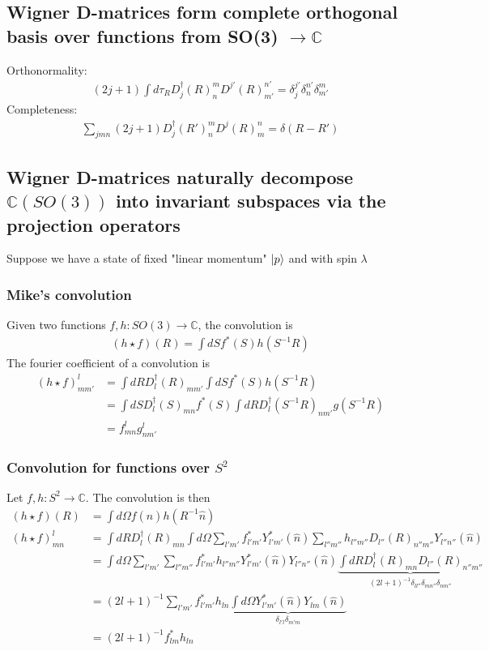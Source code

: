 \documentclass{article}
\begin{document}
\subsection{Wigner D-matrices form complete orthogonal basis over functions from SO(3) $\rightarrow \mathbb{C}$}

Orthonormality:
\begin{align}
    (2j+1)\int d\tau_R D^{\dagger}_j(R)^m_n D^{j'}(R)^{n'}_{m'} = \delta^{j'}_j\delta^{n'}_n\delta^{m}_{m'}
\end{align}
Completeness:
\begin{align}
    \sum_{jmn}(2j+1)D^{\dagger}_j(R')^m_n D^{j}(R)^{n}_{m} = \delta(R - R')
\end{align}

\subsection{Wigner D-matrices naturally decompose $\mathbb{C}(SO(3))$ into invariant subspaces via the projection operators}

Suppose we have a state of fixed "linear momentum" $\ket{p}$ and with spin $\lambda$


\subsubsection{Mike's convolution}
Given two functions $f,h:SO(3)\rightarrow \mathbb{C}$, the convolution is 
\begin{align}
    (h\star f)(R) = \int dS f^{*}(S)h(S^{-1}R)
\end{align}
The fourier coefficient of a convolution is
\begin{align}
    (h \star f)^{l}_{mm'} &= \int dR D^{\dagger}_l(R)_{mm'} \int dS f^{*}(S)h(S^{-1}R)\\
    &= \int dS D^{\dagger}_l(S)_{mn} f^{*}(S) \int dR D^{\dagger}_l(S^{-1}R)_{nm'} g(S^{-1}R)\\
    &= f^{l}_{mn}g^l_{nm'}
\end{align}
\subsubsection{Convolution for functions  over $S^2$}
Let $f,h:S^2\rightarrow \mathbb{C}$. The convolution is then
\begin{align}
    (h\star f)(R) &= \int d\Omega f(\hat{n})h(R^{-1}\hat{n})\\
    (h\star f)^{l}_{mn} &= \int dR D^{\dagger}_{l}(R)_{mn}\int d\Omega \sum_{l'm'}f^{*}_{l'm'} Y^{*}_{l'm'}(\hat{n}) \sum_{l''m''}h_{l''m''}D_{l''}(R)_{n''m''}Y_{l''n''}(\hat{n})\\
    &= \int d\Omega \sum_{l'm'}\sum_{l''m''} f^{*}_{l'm'}h_{l''m''}Y^{*}_{l'm'}(\hat{n})Y_{l''n''}(\hat{n})\underbrace{\int dR D^{\dagger}_l(R)_{mn}D_{l''}(R)_{n''m''}}_{(2l+1)^{-1}\delta_{ll''}\delta_{mn''}\delta_{nm''}}\\
    &=  (2l+1)^{-1}\sum_{l'm'} f^{*}_{l'm'}h_{ln} \underbrace{\int d\Omega Y^{*}_{l'm'}(\hat{n})Y_{lm}(\hat{n})}_{\delta_{l'l}\delta_{m'm}}\\
    &= (2l+1)^{-1} f^{*}_{lm}h_{ln}\\ 
\end{align}
\end{document}

